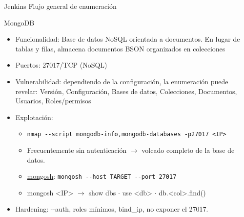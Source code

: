\documentclass[aspectratio=169,11pt]{beamer}
\newcommand{\cmd}[1]{\texttt{#1}}
\begin{document}
  \begin{frame}{Jenkins} 
    Flujo general de enumeración
    \begin{center}  \end{center} 
  \end{frame} 


\begin{frame}[allowframebreaks]{MongoDB}
\small
  \begin{itemize}
  \item Funcionalidad: Base de datos NoSQL orientada a documentos. En lugar de tablas y filas, almacena documentos BSON organizados en colecciones
  \item Puertos: 27017/TCP (NoSQL)
  \item Vulnerabilidad: dependiendo de la configuración, la enumeración puede revelar: Versión, Configuración, Bases de datos, Colecciones, Documentos, Usuarios, Roles/permisos
  \item Explotación:
  \begin{itemize}
      \item \cmd{nmap -{}-script mongodb-info,mongodb-databases -p27017 <IP>}
      \item Frecuentemente sin autenticación $\rightarrow$ volcado completo de la base de datos.
      \item \href{https://www.mongodb.com/docs/mongodb-shell/}{mongosh}: \cmd{mongosh -{}-host TARGET -{}-port 27017}
      \item mongosh <IP> $\rightarrow$ show dbs $\cdot$ use <db> $\cdot$ db.<col>.find()
        \end{itemize}

  \item Hardening: -{}-auth, roles mínimos, bind\_ip, no exponer el 27017.
  \end{itemize}
\end{frame}
\end{document}
